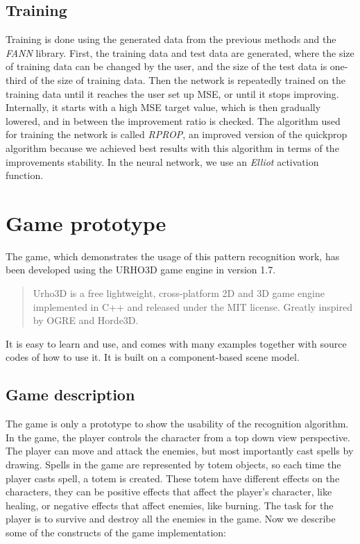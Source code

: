 \begin{description}
\begin{description}
\subsection{Training}
Training is done using the generated data from the previous methods and the \emph{FANN} library. First, the training data and test data are generated, where the size of training data can be changed by the user, and the size of the test data is one-third of the size of training data. Then the network is repeatedly trained on the training data until it reaches the user set up MSE, or until it stops improving. Internally, it starts with a high MSE target value, which is then gradually lowered, and in between the improvement ratio is checked. The algorithm used for training the network is called \emph{RPROP}, an improved version of the quickprop algorithm because we achieved best results with this algorithm in terms of the improvements stability. In the neural network, we use an \emph{Elliot} activation function.

\section{Game prototype}
The game, which demonstrates the usage of this pattern recognition work, has been developed using the URHO3D game engine in version 1.7. \begin{quotation} Urho3D is a free lightweight, cross-platform 2D and 3D game engine implemented in C++ and released under the MIT license. Greatly inspired by OGRE and Horde3D. \end{quotation} It is easy to learn and use, and comes with many examples together with source codes of how to use it. It is built on a component-based scene model. 

\subsection{Game description}
The game is only a prototype to show the usability of the recognition algorithm. In the game, the player controls the character from a top down view perspective. The player can move and attack the enemies, but most importantly cast spells by drawing. Spells in the game are represented by totem objects, so each time the player casts spell, a totem is created. These totem have different effects on the characters, they can be positive effects that affect the player's character, like healing, or negative effects that affect enemies, like burning. The task for the player is to survive and destroy all the enemies in the game. Now we describe some of the constructs of the game implementation:


\end{description}
\end{description}
